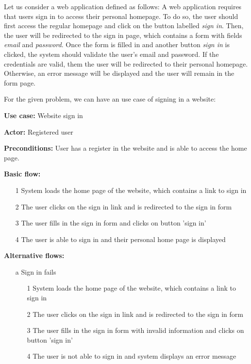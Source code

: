 
Let us consider a web application defined as follows: A web application requires that users sign in to access their personal homepage. To do so, the user should first access the regular homepage and click on the button labelled \textit{sign in}. Then, the user will be redirected to the sign in page, which contains a form with fields \textit{email} and \textit{password}. Once the form is filled in and another button \textit{sign in} is clicked, the system should validate the user's email and password. If the credentials are valid, them the user will be redirected to their personal homepage. Otherwise, an error message will be displayed and the user will remain in the form page.

For the given problem, we can have an use case of signing in a website:

\textbf{Use case:} Website sign in

\textbf{Actor:} Registered user

\textbf{Preconditions:} User has a register in the website and is able to access the home page. 

\textbf{Basic flow:}

\begin{itemize}

\item[1] System loads the home page of the website, which contains a link to sign in

\item[2] The user clicks on the sign in link and is redirected to the sign in form

\item[3] The user fills in the sign in form and clicks on button 'sign in'

\item[4] The user is able to sign in and their personal home page is displayed
\end{itemize}

\textbf{Alternative flows:}

\begin{itemize}

\item[a] Sign in fails

\begin{itemize}

\item[1] System loads the home page of the website, which contains a link to sign in

\item[2] The user clicks on the sign in link and is redirected to the sign in form

\item[3] The user fills in the sign in form with invalid information and clicks on button 'sign in'

\item[4] The user is not able to sign in and system displays an error message
\end{itemize} 
\end{itemize}


